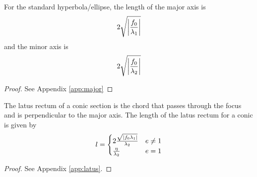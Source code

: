     \begin{corollary} For the standard hyperbola/ellipse, the length of the major axis is 
  \begin{align}
\label{eq:chord-len-major}
 2\sqrt{\left\vert\frac{
f_0}
{\lambda_1}
	  \right\vert}
  \end{align}
  and the minor axis is 
  \begin{align}
\label{eq:chord-len-minor}
 2\sqrt{\left\vert\frac{
f_0}
{\lambda_2}
	  \right\vert}
  \end{align}
\end{corollary}
\begin{proof}
	See Appendix \ref{app:major}
\end{proof}
\begin{theorem}
    The latus rectum of a conic section is the chord that passes through the focus and is perpendicular to the major axis.
	The length of the latus rectum for a conic is given by
		\begin{align}
			l =
			\begin{cases}
				2\frac{\sqrt{\left\vert f_0\lambda_1\right\vert}}{\lambda_2} & e \ne 1
			\\
			\frac{\eta}{\lambda_2} & e = 1
			\end{cases}
			\label{eq:latus-ellipse}
		\end{align}
\end{theorem}
		\begin{proof}
			See Appendix \ref{app:latus}.
\end{proof}
